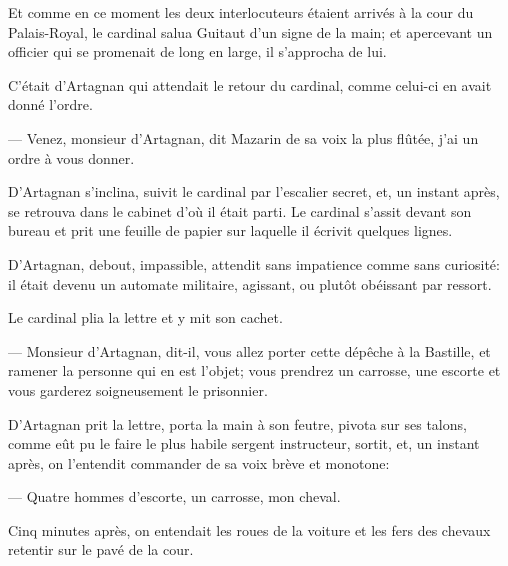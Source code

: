 Et comme en ce moment les deux interlocuteurs étaient arrivés à la cour du Palais-Royal, le cardinal salua Guitaut d'un signe de la main; et apercevant un officier qui se promenait de long en large, il s'approcha de lui.

C'était d'Artagnan qui attendait le retour du cardinal, comme celui-ci en avait donné l'ordre.

— Venez, monsieur d'Artagnan, dit Mazarin de sa voix la plus flûtée, j'ai un ordre à vous donner.

D'Artagnan s'inclina, suivit le cardinal par l'escalier secret, et, un instant après, se retrouva dans le cabinet d'où il était parti. Le cardinal s'assit devant son bureau et prit une feuille de papier sur laquelle il écrivit quelques lignes.

D'Artagnan, debout, impassible, attendit sans impatience comme sans curiosité: il était devenu un automate militaire, agissant, ou plutôt obéissant par ressort.

Le cardinal plia la lettre et y mit son cachet.

— Monsieur d'Artagnan, dit-il, vous allez porter cette dépêche à la Bastille, et ramener la personne qui en est l'objet; vous prendrez un carrosse, une escorte et vous garderez soigneusement le prisonnier.

D'Artagnan prit la lettre, porta la main à son feutre, pivota sur ses talons, comme eût pu le faire le plus habile sergent instructeur, sortit, et, un instant après, on l'entendit commander de sa voix brève et monotone:

— Quatre hommes d'escorte, un carrosse, mon cheval.

Cinq minutes après, on entendait les roues de la voiture et les fers des chevaux retentir sur le pavé de la cour.